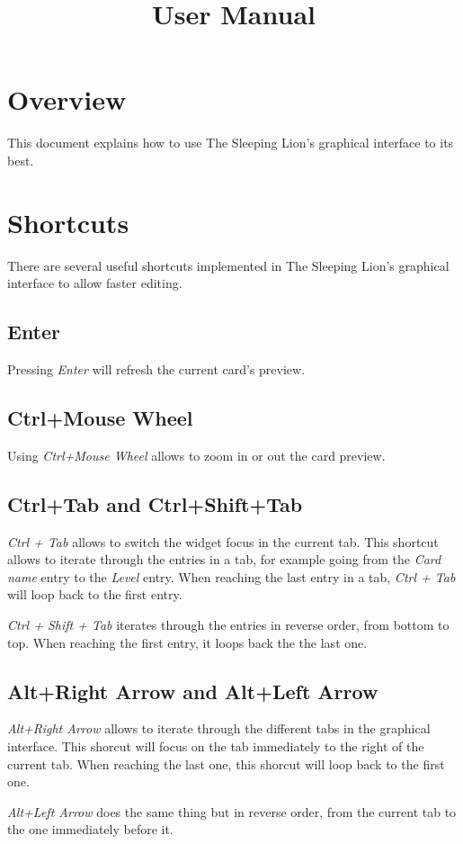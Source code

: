 \documentclass{article}
\title{User Manual}
\date{}
\begin{document}
\maketitle
\tableofcontents

\section{Overview}
This document explains how to use The Sleeping Lion's graphical interface to its best.

\section{Shortcuts}
There are several useful shortcuts implemented in The Sleeping Lion's graphical interface to allow faster editing.

\subsection{Enter}
Pressing \textit{Enter} will refresh the current card's preview.

\subsection{Ctrl+Mouse Wheel}
Using \textit{Ctrl+Mouse Wheel} allows to zoom in or out the card preview.

\subsection{Ctrl+Tab and Ctrl+Shift+Tab}
\textit{Ctrl + Tab} allows to switch the widget focus in the current tab. This shortcut allows to iterate through the entries in a tab, for example going from the \textit{Card name} entry to the \textit{Level} entry. When reaching the last entry in a tab, \textit{Ctrl + Tab} will loop back to the first entry.

\textit{Ctrl + Shift + Tab} iterates through the entries in reverse order, from bottom to top. When reaching the first entry, it loops back the the last one.

\subsection{Alt+Right Arrow and Alt+Left Arrow}
\textit{Alt+Right Arrow} allows to iterate through the different tabs in the graphical interface. This shorcut will focus on the tab immediately to the right of the current tab. When reaching the last one, this shorcut will loop back to the first one.

\textit{Alt+Left Arrow} does the same thing but in reverse order, from the current tab to the one immediately before it.
\end{document}

